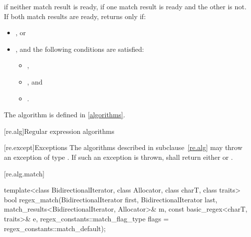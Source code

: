 \begin{itemdescr}
\pnum
\returns
{} if neither match result is ready,  if one match result is ready and the
other is not. If both match results are ready, returns  only if:
\begin{itemize}
\item
{}, or

\item
{}, and the following conditions are satisfied:
\begin{itemize}
\item
{},

\item
{}, and

\item
{}.
\end{itemize}
\end{itemize}
\begin{note}
The algorithm  is defined in \ref{algorithms}.
\end{note}
\end{itemdescr}

[re.alg]{Regular expression algorithms}

[re.except]{Exceptions}
\pnum
The algorithms described in subclause~\ref{re.alg} may throw an exception
of type . If such an exception  is thrown,
 shall return either 
or .

[re.alg.match]{}
%
\begin{itemdecl}
template<class BidirectionalIterator, class Allocator, class charT, class traits>
  bool regex_match(BidirectionalIterator first, BidirectionalIterator last,
                   match_results<BidirectionalIterator, Allocator>& m,
                   const basic_regex<charT, traits>& e,
                   regex_constants::match_flag_type flags = regex_constants::match_default);
\end{itemdecl}

